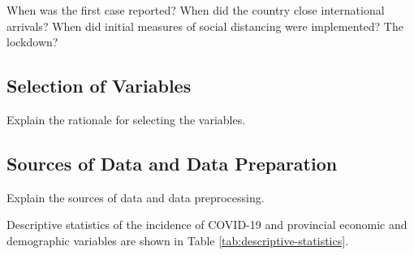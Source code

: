 \documentclass[]{elsarticle} %
\begin{document}
When was the first case reported? When did the country close
international arrivals? When did initial measures of social distancing
were implemented? The lockdown?

\hypertarget{selection-of-variables}{%
\subsection{Selection of Variables}\label{selection-of-variables}}

Explain the rationale for selecting the variables.

\hypertarget{sources-of-data-and-data-preparation}{%
\subsection{Sources of Data and Data
Preparation}\label{sources-of-data-and-data-preparation}}

Explain the sources of data and data preprocessing.

Descriptive statistics of the incidence of COVID-19 and provincial
economic and demographic variables are shown in Table
\ref{tab:descriptive-statistics}.

\begin{table}

\caption{\label{tab:descriptive-statistics}\label{tab:descriptive-statistics}Descriptive statistics}
\centering
{}
\end{table}
\end{document}
